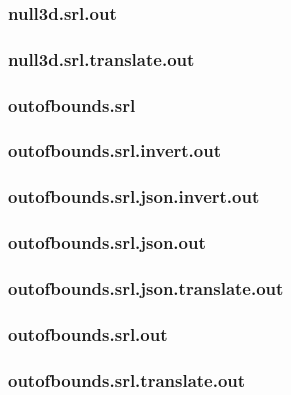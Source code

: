 \subsubsection{null3d.srl.out}
\label{app:null3d_srl.out}

\subsubsection{null3d.srl.translate.out}
\label{app:null3d_srl.translate.out}

\subsubsection{outofbounds.srl}
\label{app:outofbounds_srl}

\subsubsection{outofbounds.srl.invert.out}
\label{app:outofbounds_srl.invert.out}

\subsubsection{outofbounds.srl.json.invert.out}
\label{app:outofbounds_srl.json.invert.out}

\subsubsection{outofbounds.srl.json.out}
\label{app:outofbounds_srl.json.out}

\subsubsection{outofbounds.srl.json.translate.out}
\label{app:outofbounds_srl.json.translate.out}

\subsubsection{outofbounds.srl.out}
\label{app:outofbounds_srl.out}

\subsubsection{outofbounds.srl.translate.out}
\label{app:outofbounds_srl.translate.out}

